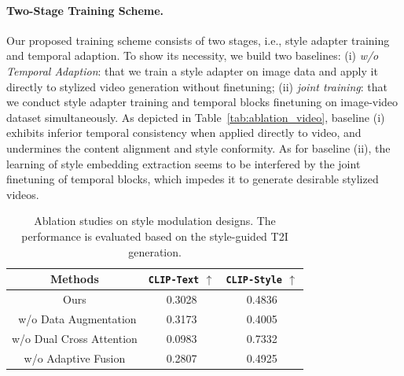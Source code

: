 \paragraph{Two-Stage Training Scheme.}
Our proposed training scheme consists of two stages, i.e., style adapter training and temporal adaption. To show its necessity, we build two baselines: (i) \textit{w/o Temporal Adaption}: that we train a style adapter on image data and apply it directly to stylized video generation without finetuning; (ii) \textit{joint training}: that we conduct style adapter training and temporal blocks finetuning on image-video dataset simultaneously.
As depicted in Table~\ref{tab:ablation_video}, baseline (i) exhibits inferior temporal consistency when applied directly to video, and undermines the content alignment and style conformity. As for baseline (ii), the learning of style embedding extraction seems to be interfered by the joint finetuning of temporal blocks, which impedes it to generate desirable stylized videos.


\begin{table}[!t]
\centering

\caption{Ablation studies on style modulation designs. The performance is evaluated based on the style-guided T2I generation.}
\label{tab:ablation_img}
\vspace{-1em}
    
\small
  \begin{tabular}{ccc} %
    \hline
    Methods & \texttt{CLIP-Text} $\uparrow$ & \texttt{CLIP-Style} $\uparrow$ \\
    \hline
    Ours & 0.3028 & 0.4836 \\
    ~w/o Data Augmentation & 0.3173 & 0.4005 \\
    w/o Dual Cross Attention & 0.0983 & 0.7332 \\
    w/o Adaptive Fusion & 0.2807 & 0.4925 \\
    \hline
  \end{tabular}
\vspace{-1em}
\end{table}


